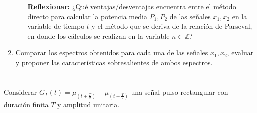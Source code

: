 \documentclass[12pt,a4paper]{report}
\begin{document}
\begin{enumerate}[label=\alph*),left=0pt]
\begin{itemize}[left=0pt]
      \textbf{Reflexionar:} ¿Qué ventajas/desventajas encuentra entre el método directo para calcular la potencia media 
      $P_1, P_2$ de las señales $x_1, x_2$ en la variable de tiempo $t$ y el método que se deriva de la relación de 
      Parseval, en donde los cálculos se realizan en la variable $n \in \mathbb{Z}$?

  \end{itemize}

  \item Comparar los espectros obtenidos para cada una de las señales $x_1, x_2$, evaluar y proponer las 
    características sobresalientes de ambos espectros.
\end{enumerate}

\chapter{}%

Considerar $G_T(t) = \mu_{(t + \frac{T}{2})} - \mu_{(t - \frac{T}{2})}$ una señal pulso rectangular con duración finita
$T$ y amplitud unitaria.
\end{document}
